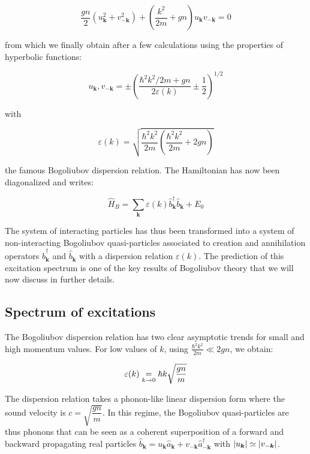 \begin{equation}
    \frac{g n}{2}\left(u_{\bm{k}}^{2}+v_{-\bm{k}}^{2}\right)+\left(\frac{k^{2}}{2 m}+g n\right) u_{\bm{k}} v_{-\bm{k}}=0
\end{equation}

\noindent from which we finally obtain after a few calculations using the properties of hyperbolic functions:

\begin{equation}
    u_{\bm{k}}, v_{-\bm{k}}=\pm\left(\frac{\hbar^2k^{2} / 2 m+g n}{2 \varepsilon(k)} \pm \frac{1}{2}\right)^{1 / 2}
\end{equation}

\noindent with 

\begin{equation}
    \varepsilon(k)=\sqrt{\frac{\hbar^2 k^2}{2m}\left(\frac{\hbar^2 k^2}{2m}+2gn \right)}
\end{equation}

\noindent the famous Bogoliubov dispersion relation. The Hamiltonian has now been diagonalized and writes:

\begin{equation}
    \hat{H}_B = \sum_{\bm{k}}\varepsilon(k) \hat{b}^{\dagger}_{\bm{k}}  \hat{b}_{\bm{k}}+E_0
\end{equation}

\noindent The system of interacting particles has thus been transformed into a system of non-interacting Bogoliubov quasi-particles associated to creation and annihilation operators $\hat{b}^{\dagger}_{\bm{k}}$ and $\hat{b}_{\bm{k}}$ with a dispersion relation $\varepsilon(k)$. The prediction of this excitation spectrum is one of the key results of Bogoliubov theory that we will now discuss in further details.

\subsection{Spectrum of excitations}
\label{sec:spectrum}

The Bogoliubov dispersion relation has two clear asymptotic trends for small and high momentum values. For low values of $k$, using $\frac{\hbar^2 k^2}{2m} \ll 2gn$, we obtain:

\begin{equation}
    \varepsilon(k) \underrel{k \to 0}{=} \hbar k \sqrt{\frac{gn}{m}}
\end{equation}

\noindent The dispersion relation takes a phonon-like linear dispersion form where the sound velocity is $c=\sqrt{\dfrac{gn}{m}}$. In this regime, the Bogoliubov quasi-particles are thus phonons that can be seen as a coherent superposition of a forward and backward propagating real particles $\hat{b}_{\bm{k}}=u_{\bm{k}} \hat{a}_{\bm{k}} + v_{-\bm{k}} \hat{a}^{\dagger}_{-\bm{k}}$ with $\left\lvert u_{\bm{k}}\right\rvert \simeq \left\lvert v_{-\bm{k}}\right\rvert$.


